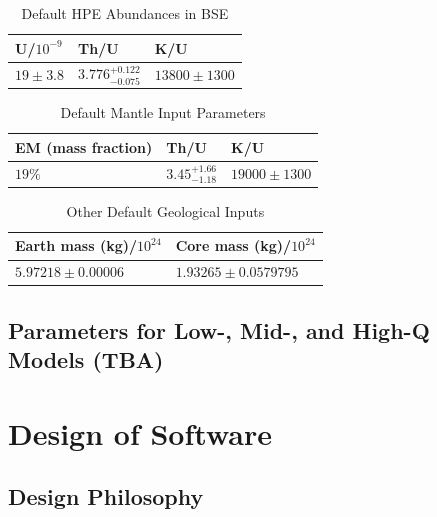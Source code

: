 				\begin{table}[H]
					\centering
					\caption{Default HPE Abundances in BSE}
					\begin{tabular}{p{3cm}p{3cm}p{3cm}}
						\hline
						\hline
						U/$10^{-9}$ & Th/U & K/U\\
						\hline
						$19 \pm 3.8$ & $3.776^{+0.122}_{-0.075}$ & $13800 \pm 1300$\\
						\hline
						\hline
					\end{tabular}
					\label{Table: BSE Default Abundance Input}
				\end{table}
				\begin{table}[H]
					\centering
					\caption{Default Mantle Input Parameters}
					\begin{tabular}{p{3.5cm}p{3cm}p{3cm}}
						\hline
						\hline
						EM (mass fraction) & Th/U & K/U \\
						\hline
						$19\%$ & $3.45^{+1.66}_{-1.18}$ & $19000 \pm 1300$\\
						\hline
						\hline
					\end{tabular}
				\end{table}
				\begin{table}[H]
					\centering
					\caption{Other Default Geological Inputs}
					\begin{tabular}{p{4cm}|p{4cm}}
						\hline
						\hline
						Earth mass (kg)/$10^{24}$ & Core mass (kg)/$10^{24}$\\
						\hline
						$5.97218 \pm 0.00006 $ & $ 1.93265 \pm 0.0579795$\\
						\hline
						\hline
					\end{tabular}
					\label{Table: Other Default Geology Input}
				\end{table}
		\section{Parameters for Low-, Mid-, and High-Q Models (TBA)}
	\chapter{Design of Software}
		\section{Design Philosophy}
